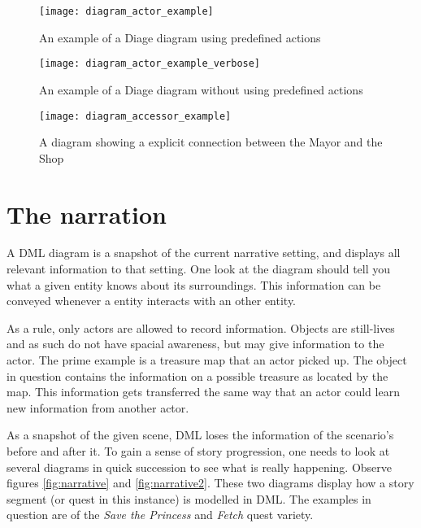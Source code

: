 \begin{figure}[ht]
	\texttt{[image: diagram\_actor\_example]}
	\caption{An example of a Diage diagram using predefined actions}\label{fig:examplediagram}
\end{figure}
\begin{figure}
	\texttt{[image: diagram\_actor\_example\_verbose]}
	\caption{An example of a Diage diagram without using predefined actions}\label{fig:examplediagramverbose}
\end{figure}
\begin{figure}
	\texttt{[image: diagram\_accessor\_example]}
	\caption{A \diage diagram showing a explicit connection between the Mayor and the Shop}
	\label{fig:example:accessors}
	
\end{figure}

\section{The narration}	
A DML diagram is a snapshot of the current narrative setting, and displays all relevant information to that setting.
One look at the diagram should tell you what a given entity knows about its surroundings.
This information can be conveyed whenever a entity interacts with an other entity.

As a rule, only actors are allowed to record information.
Objects are still-lives and as such do not have spacial awareness, but may give information to the actor.
The prime example is a treasure map that an actor picked up.
The object in question contains the information on a possible treasure as located by the map.
This information gets transferred the same way that an actor could learn new information from another actor.

As a snapshot of the given scene, DML loses the information of the scenario's before and after it. To gain a sense of story progression, one needs to look at several diagrams in quick succession to see what is really happening. Observe figures \ref{fig:narrative} and \ref{fig:narrative2}. These two diagrams display how a story segment (or quest in this instance) is modelled in DML. The examples in question are of the \textit{Save the Princess} and \textit{Fetch} quest variety. 

